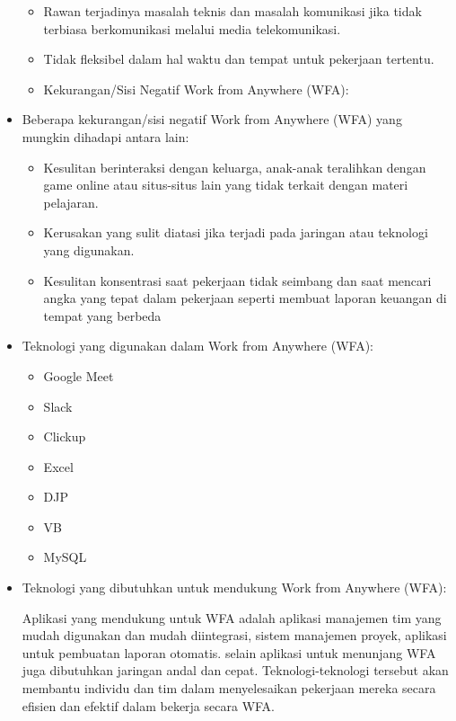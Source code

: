 \documentclass[review]{elsarticle}
\begin{document}
\begin{itemize}
\begin{itemize}
\item Rawan terjadinya masalah teknis dan masalah komunikasi jika tidak terbiasa berkomunikasi melalui media telekomunikasi.
\item Tidak fleksibel dalam hal waktu dan tempat untuk pekerjaan tertentu.
\item Kekurangan/Sisi Negatif Work from Anywhere (WFA):
\end{itemize}
\item Beberapa kekurangan/sisi negatif Work from Anywhere (WFA) yang mungkin dihadapi antara lain:
\begin{itemize}
\item Kesulitan berinteraksi dengan keluarga, anak-anak teralihkan dengan game online atau situs-situs lain yang tidak terkait dengan materi pelajaran.
\item Kerusakan yang sulit diatasi jika terjadi pada jaringan atau teknologi yang digunakan.
\item Kesulitan konsentrasi saat pekerjaan tidak seimbang dan saat mencari angka yang tepat dalam pekerjaan seperti membuat laporan keuangan di tempat yang berbeda
\end{itemize}
\item Teknologi yang digunakan dalam Work from Anywhere (WFA):
\begin{itemize}
\item Google Meet
\item Slack
\item Clickup
\item Excel
\item DJP
\item VB
\item MySQL
\end{itemize}
\item Teknologi yang dibutuhkan untuk mendukung Work from Anywhere (WFA):

Aplikasi yang mendukung untuk WFA adalah aplikasi manajemen tim yang mudah digunakan dan mudah diintegrasi, sistem manajemen proyek, aplikasi untuk pembuatan laporan otomatis. selain aplikasi untuk menunjang WFA juga dibutuhkan jaringan andal dan cepat. Teknologi-teknologi tersebut akan membantu individu dan tim dalam menyelesaikan pekerjaan mereka secara efisien dan efektif dalam bekerja secara WFA. 


\end{itemize}
\end{document}
